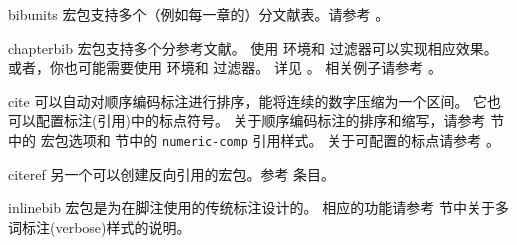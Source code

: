 \begin{marglist}
\item[bibunits]
 宏包支持多个（例如每一章的）分文献表。请参考 。

\item[chapterbib]
 宏包支持多个分参考文献。
使用  环境和  过滤器可以实现相应效果。
或者，你也可能需要使用  环境和  过滤器。
详见 。
相关例子请参考 。

\item[cite]
 可以自动对顺序编码标注进行排序，能将连续的数字压缩为一个区间。
它也可以配置标注(引用)中的标点符号。
关于顺序编码标注的排序和缩写，请参考  节中的  宏包选项和  节中的 \texttt{numeric-comp} 引用样式。
关于可配置的标点请参考 。

\item[citeref]
另一个可以创建反向引用的宏包。参考  条目。

\item[inlinebib]
 宏包是为在脚注使用的传统标注设计的。
相应的功能请参考  节中关于多词标注(verbose)样式的说明。


\end{marglist}
